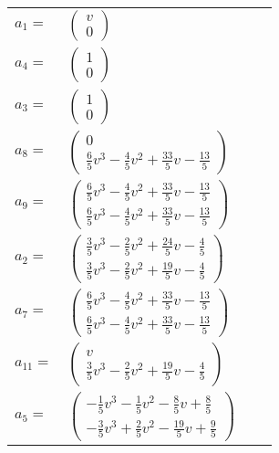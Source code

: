 \documentclass[1p]{elsarticle_modified}
\theoremstyle{definition}
\begin{document}
\begin{tabular}{m{7pt} m{180pt} m{7pt} m{180pt} }
\flushright $a_{1}=$&$\begin{pmatrix}v\\0\end{pmatrix}$ \\
\flushright $a_{4}=$&$\begin{pmatrix}1\\0\end{pmatrix}$ \\
\flushright $a_{3}=$&$\begin{pmatrix}1\\0\end{pmatrix}$ \\
\flushright $a_{8}=$&$\begin{pmatrix}0\\\frac{6}{5} v^3-\frac{4}{5} v^2+\frac{33}{5} v-\frac{13}{5}\end{pmatrix}$ \\
\flushright $a_{9}=$&$\begin{pmatrix}\frac{6}{5} v^3-\frac{4}{5} v^2+\frac{33}{5} v-\frac{13}{5}\\\frac{6}{5} v^3-\frac{4}{5} v^2+\frac{33}{5} v-\frac{13}{5}\end{pmatrix}$ \\
\flushright $a_{2}=$&$\begin{pmatrix}\frac{3}{5} v^3-\frac{2}{5} v^2+\frac{24}{5} v-\frac{4}{5}\\\frac{3}{5} v^3-\frac{2}{5} v^2+\frac{19}{5} v-\frac{4}{5}\end{pmatrix}$ \\
\flushright $a_{7}=$&$\begin{pmatrix}\frac{6}{5} v^3-\frac{4}{5} v^2+\frac{33}{5} v-\frac{13}{5}\\\frac{6}{5} v^3-\frac{4}{5} v^2+\frac{33}{5} v-\frac{13}{5}\end{pmatrix}$ \\
\flushright $a_{11}=$&$\begin{pmatrix}v\\\frac{3}{5} v^3-\frac{2}{5} v^2+\frac{19}{5} v-\frac{4}{5}\end{pmatrix}$ \\
\flushright $a_{5}=$&$\begin{pmatrix}-\frac{1}{5} v^3-\frac{1}{5} v^2-\frac{8}{5} v+\frac{8}{5}\\-\frac{3}{5} v^3+\frac{2}{5} v^2-\frac{19}{5} v+\frac{9}{5}\end{pmatrix}$ \\

\end{tabular}
\end{document}
